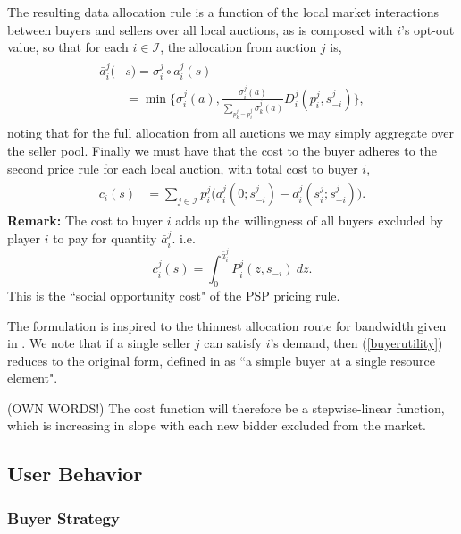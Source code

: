 \documentclass[sigconf, anonymous]{acmart}
\newcommand{\mcI}{\mathcal{I}}
\newcommand{\g}{\sigma}
\theoremstyle{definition}
\begin{document}
The resulting data allocation rule is a function of the local market
interactions between buyers and sellers over all local auctions, as is composed with $i$'s opt-out value, so that for each $i \in \mcI$, the
allocation from auction $j$ is,
\begin{align}\label{dataallocation}
\begin{split}
    \bar{a}_i^j(&s) = \g_i^j \circ a_i^j(s) \\
    &= \min\bigg\lbrace \g_i^j(a), 
    \frac{\g_i^j(a)}{\displaystyle\sum_{p_k^j= p_i^j}\g_k^j(a)} 
D_i^j(p_i^j,s_{-i}^j)\bigg\rbrace,
\end{split}
\end{align}
noting that for the full allocation from all auctions we may simply aggregate
over the seller pool.
Finally we must have that the cost to the buyer adheres to the second price
rule for each local auction, with total cost to buyer $i$,
\begin{align}\label{datacost}
\begin{split}
    \bar{c}_i(s) &= \displaystyle\sum_{j\in\mcI} 
    p_i^j \bigg(\bar{a}_i^j(0; s_{-i}^j)
    -\bar{a}_i^j(s_i^j;s_{-i}^j)\bigg).
\end{split}
\end{align}
\textbf{Remark:} The cost to buyer $i$ adds up the willingness
of all buyers excluded by player $i$ to pay for quantity $\bar{a}_i^j$. i.e.
$$
    c_i^j(s) = \displaystyle\int_0^{\bar{a}_i^j} P_i^j(z, s_{-i}) \ dz.
$$
This is the ``social opportunity cost" of the PSP pricing rule.

The formulation is inspired to the thinnest allocation route for
bandwidth given in \cite{lazar}. We note that if a single seller $j$ can
satisfy $i$'s demand, then
(\ref{buyerutility}) reduces to the original form, defined in
\cite{semret} as ``a simple buyer at a single resource element".

(OWN WORDS!)
The cost function will therefore be a stepwise-linear function, which is
increasing in slope with each new bidder excluded from the market.

\subsection{User Behavior}

\subsubsection{Buyer Strategy}
 
\end{document}
